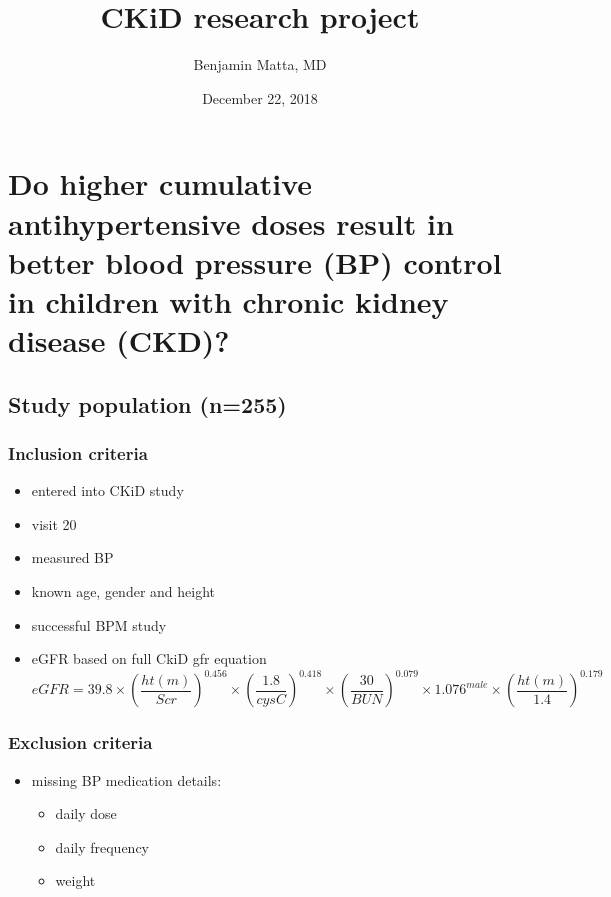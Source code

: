 \documentclass[]{article}
\title{CKiD research project}
\author{Benjamin Matta, MD}
\date{December 22, 2018}
\providecommand{\tightlist}{%
  \setlength{\itemsep}{0pt}\setlength{\parskip}{0pt}}
\begin{document}
\maketitle

\hypertarget{do-higher-cumulative-antihypertensive-doses-result-in-better-blood-pressure-bp-control-in-children-with-chronic-kidney-disease-ckd}{%
\section{Do higher cumulative antihypertensive doses result in better
blood pressure (BP) control in children with chronic kidney disease
(CKD)?}\label{do-higher-cumulative-antihypertensive-doses-result-in-better-blood-pressure-bp-control-in-children-with-chronic-kidney-disease-ckd}}

\hypertarget{study-population-n255}{%
\subsection{Study population (n=255)}\label{study-population-n255}}

\hypertarget{inclusion-criteria}{%
\subsubsection{Inclusion criteria}\label{inclusion-criteria}}

\begin{itemize}
\tightlist
\item
  entered into CKiD study
\item
  visit 20
\item
  measured BP
\item
  known age, gender and height
\item
  successful BPM study
\item
  eGFR based on full CkiD gfr equation
  \[ eGFR = 39.8 \times \left ( \frac{ht(m)}{Scr} \right )^{0.456} \times \left( \frac{1.8}{cysC} \right )^{0.418}\times \left ( \frac{30}{BUN} \right )^{0.079}\times 1.076^{male}\times \left ( \frac{ht(m)}{1.4} \right )^{0.179} \]
\end{itemize}

\hypertarget{exclusion-criteria}{%
\subsubsection{Exclusion criteria}\label{exclusion-criteria}}

\begin{itemize}
\tightlist
\item
  missing BP medication details:

  \begin{itemize}
  \tightlist
  \item
    daily dose
  \item
    daily frequency
  \item
    weight
  \end{itemize}
\end{itemize}
\end{document}
